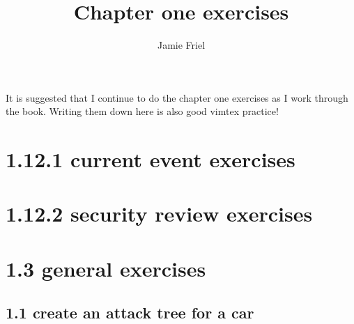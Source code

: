 \documentclass[a4paper]{article}
\title{Chapter one exercises}
\author{Jamie Friel}
\begin{document}
\maketitle
\tableofcontents
\newpage
It is suggested that I continue to do the chapter one exercises as I work through the book. Writing them down here is also good vimtex practice!
\section{1.12.1 current event exercises }

\section{1.12.2 security review exercises}


\section{1.3 general exercises}

\subsection{1.1 create an attack tree for a car}
\end{document}
